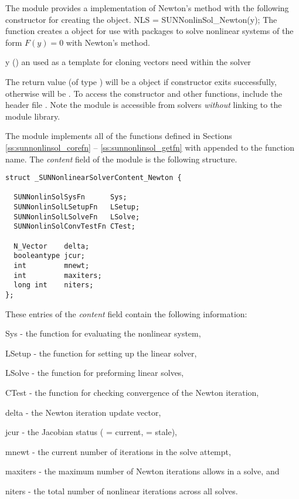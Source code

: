 The {\sunnonlinsolnewton} module provides a {\sunnonlinsol}
implementation of Newton's method with the following constructor for
creating the  object.
{
  NLS = SUNNonlinSol\_Newton(y);
}
{
  The function  creates a
   object for use with {\sundials} packages to
  solve nonlinear systems of the form $F(y) = 0$ with Newton's method.
}
{
  \begin{args}[y]
  \item[y] ()
    an  used as a template for cloning vectors need within
    the solver
  \end{args}
}
{
  The return value  (of type ) will be
  a {\sunnonlinsol} object if constructor exits successfully,
  otherwise  will be .
}
{}
To access the constructor and other {\sunnonlinsolnewton} functions,
include the header file . Note
the {\sunnonlinsolnewton} module is accessible from {\sundials}
solvers \textit{without} linking to the
 module library.

The {\sunnonlinsolnewton} module implements all of the functions
defined in Sections \ref{ss:sunnonlinsol_corefn} --
\ref{ss:sunnonlinsol_getfn} with  appended to the
function name. The \textit{content} field of the {\sunnonlinsolnewton}
module is the following structure.
\begin{verbatim} 
struct _SUNNonlinearSolverContent_Newton {

  SUNNonlinSolSysFn      Sys;
  SUNNonlinSolLSetupFn   LSetup;
  SUNNonlinSolLSolveFn   LSolve;
  SUNNonlinSolConvTestFn CTest;

  N_Vector    delta;
  booleantype jcur;
  int         mnewt;
  int         maxiters;
  long int    niters;
};
\end{verbatim}
These entries of the \emph{content} field contain the following
information:
\begin{args}[maxiters]
  \item[Sys] - the function for evaluating the nonlinear system,
  \item[LSetup] - the function for setting up the linear solver,
  \item[LSolve] - the function for preforming linear solves,
  \item[CTest] - the function for checking convergence of the Newton
    iteration,
  \item[delta] - the Newton iteration update vector,
  \item[jcur] - the Jacobian status ( =
  current,  = stale),
  \item[mnewt] - the current number of iterations in the solve attempt,
  \item[maxiters] - the maximum number of Newton iterations allows in
    a solve, and
  \item[niters] - the total number of nonlinear iterations across all
    solves.
\end{args}

